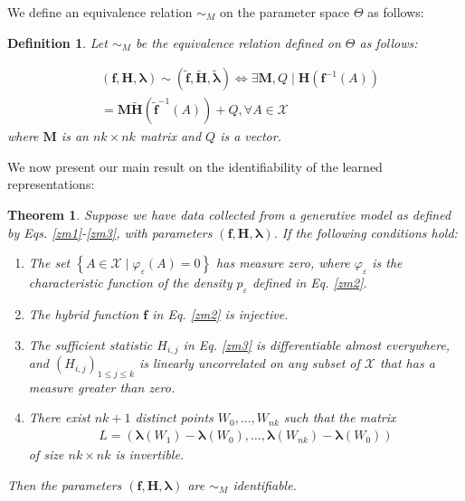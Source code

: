 \documentclass[sigconf]{acmart}
\newtheorem{theorem}{Theorem}		%
\newtheorem{definition}{Definition}
\begin{document}
We define an equivalence relation $\sim_M$ on the parameter space $\Theta$ as follows:
\begin{definition}
Let $\sim_M$ be the equivalence relation defined on $\Theta$ as follows:

\begin{equation}
\begin{split}
& (\mathbf{f}, \mathbf{H}, \mathbf{\lambda}) \sim(\tilde{\mathbf{f}}, \tilde{\mathbf{H}}, \tilde{\mathbf{\lambda}}) 
 \Leftrightarrow \exists \mathbf{M}, {Q} \mid \mathbf{H}\left(\mathbf{f}^{-1}({A})\right)
 \\&=\mathbf{M} \tilde{\mathbf{H}}\left(\tilde{\mathbf{f}}^{-1}({A})\right)+{Q}, \forall {A} \in \mathcal{X}
\end{split}
\end{equation}
where $\mathbf{M}$ is an $n k \times n k$ matrix and ${Q}$ is a vector.

\end{definition}


We now present our main result on the identifiability of the learned representations:

\begin{theorem}
\label{Theorem 2}
Suppose we have data collected from a generative model as defined by Eqs. \eqref{zm1}-\eqref{zm3}, with parameters \( (\mathbf{f}, \mathbf{H}, \mathbf{\lambda}) \). 
If the following conditions hold:
\begin{enumerate}[label=(\roman *)]
\item 
\label{i}
The set $\left\{{A} \in \mathcal{X} \mid \varphi_{\varepsilon}({A})=0\right\}$ has measure zero, where $\varphi_{\varepsilon}$ is the  characteristic function of the density $p_{\varepsilon}$ defined in Eq. \eqref{zm2}. 
\item 
\label{ii}
The hybrid function $\mathbf{f}$ in Eq. \eqref{zm2} is injective.
\item
\label{iii}
The sufficient statistic $H_{i, j}$ in Eq. \eqref{zm3} is differentiable almost everywhere, and $\left(H_{i, j}\right)_{1 \leq j \leq k}$ is linearly uncorrelated on any subset of $\mathcal{X}$ that has a measure greater than zero.
\item
\label{iv}
There exist $n k+1$ distinct points ${W}_0, \ldots, {W}_{n k}$ such that the matrix
\begin{equation}
\begin{split}
L=\left(\mathbf{\lambda}\left({W}_1\right)-\mathbf{\lambda}\left({W}_0\right), \ldots, \mathbf{\lambda}\left({W}_{n k}\right)-\mathbf{\lambda}\left({W}_0\right)\right)
\end{split}
\end{equation}
of size $n k \times n k$ is invertible.
\end{enumerate}
Then the parameters $(\mathbf{f}, \mathbf{H}, \mathbf{\lambda})$ are $\sim_M$ identifiable.
\end{theorem}
\end{document}
